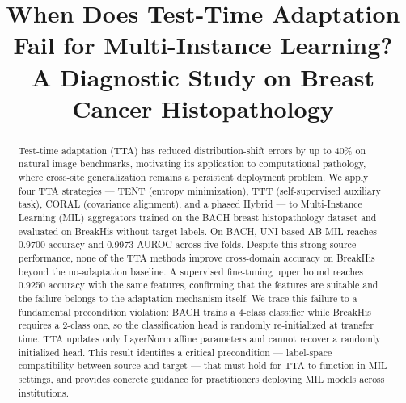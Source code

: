 \documentclass[conference]{IEEEtran}
\begin{document}
\title{When Does Test-Time Adaptation Fail for Multi-Instance Learning? A Diagnostic Study on Breast Cancer Histopathology}

\makeatletter
\newcommand{\linebreakand}{%
  \end{@IEEEauthorhalign}
  \hfill\mbox{}\par
  \mbox{}\hfill\begin{@IEEEauthorhalign}
}
\makeatother


\author{
\and
{}
}
 
\maketitle

\begin{abstract}
Test-time adaptation (TTA) has reduced distribution-shift errors by up to 40\% on natural image benchmarks, motivating its application to computational pathology, where cross-site generalization remains a persistent deployment problem. We apply four TTA strategies --- TENT (entropy minimization), TTT (self-supervised auxiliary task), CORAL (covariance alignment), and a phased Hybrid --- to Multi-Instance Learning (MIL) aggregators trained on the BACH breast histopathology dataset and evaluated on BreakHis without target labels. On BACH, UNI-based AB-MIL reaches 0.9700 accuracy and 0.9973 AUROC across five folds. Despite this strong source performance, none of the TTA methods improve cross-domain accuracy on BreakHis beyond the no-adaptation baseline. A supervised fine-tuning upper bound reaches 0.9250 accuracy with the same features, confirming that the features are suitable and the failure belongs to the adaptation mechanism itself. We trace this failure to a fundamental precondition violation: BACH trains a 4-class classifier while BreakHis requires a 2-class one, so the classification head is randomly re-initialized at transfer time. TTA updates only LayerNorm affine parameters and cannot recover a randomly initialized head. This result identifies a critical precondition --- label-space compatibility between source and target --- that must hold for TTA to function in MIL settings, and provides concrete guidance for practitioners deploying MIL models across institutions.
\end{abstract}
\end{document}
